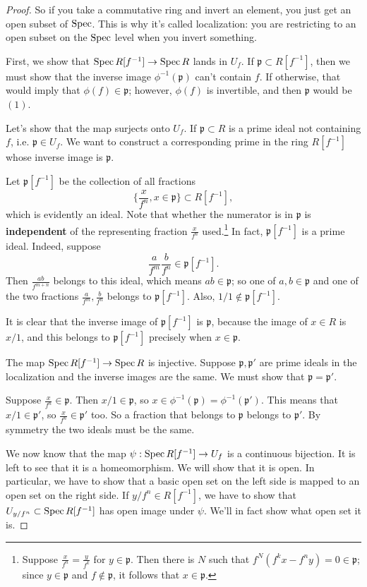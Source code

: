 \begin{proof}
So if you take a commutative ring and invert an element, you
just get an open
subset of $\operatorname{Spec}$. This is why it's called localization: you are
restricting to
an open subset on the $\operatorname{Spec} $ level when you invert something.

First, we show that $\operatorname{Spec} R[f^{-1}] \to \operatorname{Spec} R$ lands in
$U_f$. If
$\mathfrak{p} \subset R[f^{-1}]$, then we must show that the
inverse image
$\phi^{-1}(\mathfrak{p})$ can't contain $f$. If otherwise, that
would imply that
$\phi(f) \in \mathfrak{p}$; however, $\phi(f)$ is invertible,
and then
$\mathfrak{p}$ would be $(1)$.  
\item Let's show that the map surjects onto $U_f$. If
$\mathfrak{p} \subset R$ is a prime
ideal not containing $f$, i.e. $\mathfrak{p} \in U_f$. We want
to construct a
corresponding prime in the ring $R[f^{-1}]$ whose inverse image
is $\mathfrak{p}$.

Let $\mathfrak{p}[f^{-1}]$ be the collection of all fractions
\[ \{\frac{x}{f^n}, x \in \mathfrak{p}\} \subset R[f^{-1}],  \]
which is evidently an ideal. Note that whether the numerator is
in
$\mathfrak{p}$ is \textbf{independent} of the
representing fraction $\frac{x}{f^n}$ used.\footnote{Suppose
$\frac{x}{f^n} =
\frac{y}{f^k}$ for $y \in \mathfrak{p}$. Then there is $N$ such
that
$f^N(f^k x - f^n y) = 0 \in \mathfrak{p}$; since $y \in
\mathfrak{p}$ and $f
\notin \mathfrak{p}$, it follows that $x \in \mathfrak{p}$.}
In fact, $\mathfrak{p}[f^{-1}]$ is a prime ideal. Indeed,
suppose
\[  \frac{a}{f^m} \frac{b}{f^n} \in \mathfrak{p}[f^{-1}] .\]
Then $\frac{ab}{f^{m+n}}$ belongs to this ideal, which means $ab
\in
\mathfrak{p}$; so one of $a,b \in \mathfrak{p}$ and one of the
two fractions
$\frac{a}{f^m}, \frac{b}{f^n}$ belongs to
$\mathfrak{p}[f^{-1}]$. Also, $1/1
\notin \mathfrak{p}[f^{-1}]$.

It is clear that the inverse image of $\mathfrak{p}[f^{-1}]$ is
$\mathfrak{p}$,
because the image of $x \in R$ is $x/1$, and this belongs to
$\mathfrak{p}[f^{-1}]$ precisely when $x \in \mathfrak{p}$.
\item The map $\operatorname{Spec} R[f^{-1}] \to \operatorname{Spec} R$ is injective.
Suppose
$\mathfrak{p}, \mathfrak{p'}$ are prime ideals in the
localization and the
inverse images are the same.  
We must show that $\mathfrak{p} = \mathfrak{p'}$.

Suppose $\frac{x}{f^n} \in \mathfrak{p}$. Then $x/1 \in
\mathfrak{p}$, so $x
\in \phi^{-1}(\mathfrak{p}) = \phi^{-1}(\mathfrak{p}')$. This
means that $x/1
\in \mathfrak{p}'$, so 
$\frac{x}{f^n} \in \mathfrak{p}'$ too. So a fraction that
belongs to
$\mathfrak{p}$ belongs to $\mathfrak{p}'$. By symmetry the two
ideals must be
the same.  
\item We now know that the map $\psi: \operatorname{Spec} R[f^{-1}] \to U_f$
is a continuous
bijection. It is left to see that it is a homeomorphism. We will
show that it
is open.  
In particular, we have to show that a basic open set on the left
side is mapped
to an open set on the right side.
If $y/f^n \in R[f^{-1}]$, we have to show that $U_{y/f^n}
\subset \operatorname{Spec}
R[f^{-1}]$ has open image under $\psi$. We'll in fact show what
open set it is.


\end{proof}
